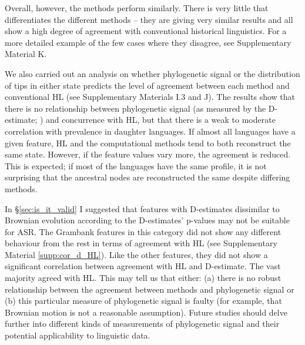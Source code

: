 \documentclass[12pt,letterpaper]{article}
\begin{document}
Overall, however, the methods perform similarly. There is very little that differentiates the different methods -- they are giving very similar results and all show a high degree of agreement with conventional historical linguistics. For a more detailed example of the few cases where they disagree, see Supplementary Material K.

We also carried out an analysis on whether phylogenetic signal \citep{fritz2010selectivity} or the distribution of tips in either state predicts the level of agreement between each method and conventional HL (see Supplementary Materials I.3 and J). The results show that there is no relationship between phylogenetic signal (as measured by the D-estimate; \citealt{fritz2010selectivity}) and concurrence with HL, but that there is a weak to moderate correlation with prevalence in daughter languages. If almost all languages have a given feature, HL and the computational methods tend to both reconstruct the same state. However, if the feature values vary more, the agreement is reduced. This is expected; if most of the languages have the same profile, it is not surprising that the ancestral nodes are reconstructed the same despite differing methods.

In §\ref{sec:is_it_valid} I suggested that features with D-estimates dissimilar to Brownian evolution according to the D-estimates' p-values may not be suitable for ASR. The Grambank features in this category did not show any different behaviour from the rest in terms of agreement with HL (see Supplementary Material \ref{supp:cor_d_HL}). Like the other features, they did not show a significant correlation between agreement with HL and D-estimate. The vast majority agreed with HL. This may tell us that either: (a) there is no robust relationship between the agreement between methods and phylogenetic signal or (b) this particular measure of phylogenetic signal is faulty (for example, that Brownian motion is not a reasonable assumption). Future studies should delve further into different kinds of measurements of phylogenetic signal and their potential applicability to linguistic data.
\end{document}
